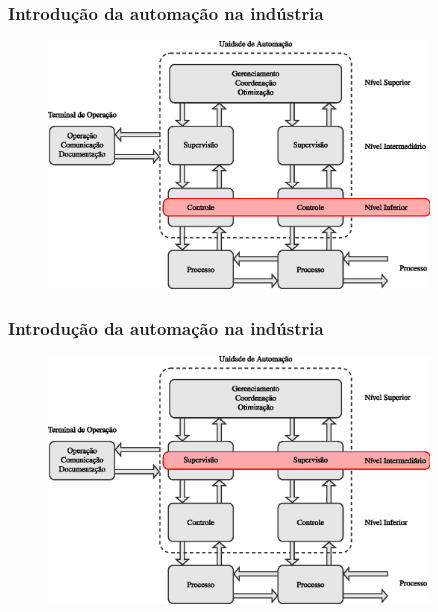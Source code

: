 \documentclass{beamer}
\begin{document}
\begin{frame}
    \frametitle{Introdução da automação na indústria}

\begin{figure}[htb]
\centering
    \includegraphics[width=0.9\textwidth]
    {imgs/introducao/eps/esquema_automacao_inf}
\end{figure}
\end{frame}

\begin{frame}
    \frametitle{Introdução da automação na indústria}

\begin{figure}[htb]
\centering
    \includegraphics[width=0.9\textwidth]
    {imgs/introducao/eps/esquema_automacao_int}
\end{figure}
\end{frame}
\end{document}
